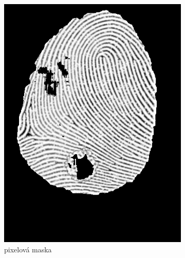 \begin{figure}[h]
\begin{subfigure}[b]{0.3\linewidth}
      \includegraphics[width=\linewidth]{obrazky-figures/roi_pixel-wise.png}
      \caption{pixelová maska}
      \label{obr:roi_pixel-wise}
    \end{subfigure}
    \hfill
    \begin{subfigure}[b]{0.3\linewidth}

\end{subfigure}
\end{figure}
